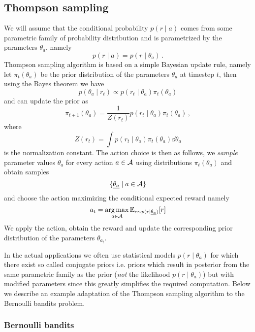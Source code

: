 \documentclass{myclass}
\begin{document}
\subsection{Thompson sampling}

We will assume that the conditional probability $p(r \mid a)$ comes from some parametric family of
probability distribution and is parametrized by the parameters $\theta_a$, namely
\[
    p(r \mid a) = p(r \mid \theta_a)\,.
\]
Thompson sampling algorithm is based on a simple Bayesian update rule, namely let $\pi_t(\theta_a)$
be the prior distribution of the parameters $\theta_a$ at timestep $t$, then using the Bayes theorem
we have
\[
    p(\theta_a \mid r_t) \propto p(r_t \mid \theta_a) \pi_t(\theta_a)
\]
and can update the prior as
\[
    \pi_{t+1}(\theta_a) = \frac{1}{Z(r_t)}p(r_t \mid \theta_a) \pi_t(\theta_a)\,,
\]
where
\[
    Z(r_t) = \int p(r_t \mid \theta_a) \pi_t(\theta_a) \dd{\theta_a}
\]
is the normalization constant. The action choice is then as follows, we \emph{sample}
parameter values $\theta_a$ for every action $a \in \mathcal{A}$ using distributions $\pi_t(\theta_a)$
and obtain samples
\[
    \{\underline{\theta_a} \mid a \in \mathcal{A}\}
\]
and choose the action maximizing the conditional expected reward namely
\[
    a_t = \operatorname*{arg\,max}_{a \in \mathcal{A}} \mathbb{E}_{r \sim p(r \mid \underline{\theta_a})}[r]
\]
We apply the action, obtain the reward and update the corresponding prior distribution of the
parameters $\theta_{a_t}$.

In the actual applications we often use statistical models $p(r \mid \theta_a)$ for which there
exist so called conjugate priors i.e. priors which result in posterior from the same parametric
family as the prior (\emph{not} the likelihood $p(r \mid \theta_a)$) but with modified parameters
since this greatly simplifies the required computation. Below we describe an example adaptation of
the Thompson sampling algorithm to the Bernoulli bandits problem.

\subsubsection{Bernoulli bandits}
\end{document}
